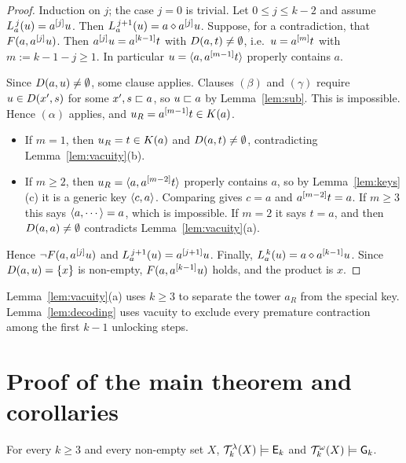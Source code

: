 \begin{proof}
Induction on $j$; the case $j=0$ is trivial. Let $0\le j\le k-2$ and assume
$L_a^{\,j}(u)=a^{[j]}u$. Then $L_a^{\,j+1}(u)=a\mathbin{\diamond}a^{[j]}u$. Suppose,
for a contradiction, that $F(a,a^{[j]}u)$. Then
$a^{[j]}u=a^{[k-1]}t$ with $D(a,t)\ne\emptyset$, i.e.\
$u=a^{[m]}t$ with $m:=k-1-j\ge1$. In particular $u=\langle a,a^{[m-1]}t\rangle$
properly contains $a$.

Since $D(a,u)\ne\emptyset$, some clause applies. Clauses $(\beta)$ and
$(\gamma)$ require $u\in D(x',s)$ for some $x',s\sqsubset a$, so $u\sqsubset a$ by
Lemma~\ref{lem:sub}. This is impossible. Hence $(\alpha)$ applies, and
$u_R=a^{[m-1]}t\in K(a)$.
\begin{itemize}
\item If $m=1$, then $u_R=t\in K(a)$ and $D(a,t)\neq\emptyset$,
  contradicting Lemma~\ref{lem:vacuity}(b).
\item If $m\ge2$, then $u_R=\langle a,a^{[m-2]}t\rangle$ properly contains $a$, so
  by Lemma~\ref{lem:keys}(c) it is a generic key $\langle c,a\rangle$. Comparing gives
  $c=a$ and $a^{[m-2]}t=a$. If $m\ge3$ this says $\langle a,\cdots\rangle=a$, which
  is impossible. If $m=2$ it says $t=a$, and then $D(a,a)\neq\emptyset$
  contradicts Lemma~\ref{lem:vacuity}(a).
\end{itemize}
Hence $\neg F(a,a^{[j]}u)$ and $L_a^{\,j+1}(u)=a^{[j+1]}u$.
Finally, $L_a^{\,k}(u)=a\mathbin{\diamond}a^{[k-1]}u$. Since $D(a,u)=\{x\}$ is
non-empty, $F(a,a^{[k-1]}u)$ holds, and the product is $x$.
\end{proof}

\begin{remark}
Lemma~\ref{lem:vacuity}(a) uses $k\ge3$ to separate the tower $a_R$ from the
special key. Lemma~\ref{lem:decoding} uses vacuity to exclude every premature
contraction among the first $k-1$ unlocking steps.
\end{remark}

\section{Proof of the main theorem and corollaries}\label{sec:main}

\begin{theorem}\label{thm:model}
For every $k\ge3$ and every non-empty set $X$, $\mathcal{T}_k^\lambda(X)\models\mathsf{E}_{k}$
and $\mathcal{T}_k^\omega(X)\models\mathsf{G}_{k}$.
\end{theorem}


